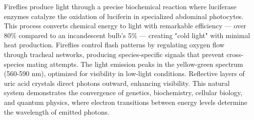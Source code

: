 Fireflies produce light through a precise biochemical reaction where luciferase enzymes catalyze the oxidation of luciferin in specialized abdominal photocytes. This process converts chemical energy to light with remarkable efficiency — over 80\% compared to an incandescent bulb's 5\% — creating "cold light" with minimal heat production. Fireflies control flash patterns by regulating oxygen flow through tracheal networks, producing species-specific signals that prevent cross-species mating attempts. The light emission peaks in the yellow-green spectrum (560-590 nm), optimized for visibility in low-light conditions. Reflective layers of uric acid crystals direct photons outward, enhancing visibility. This natural system demonstrates the convergence of genetics, biochemistry, cellular biology, and quantum physics, where electron transitions between energy levels determine the wavelength of emitted photons.
